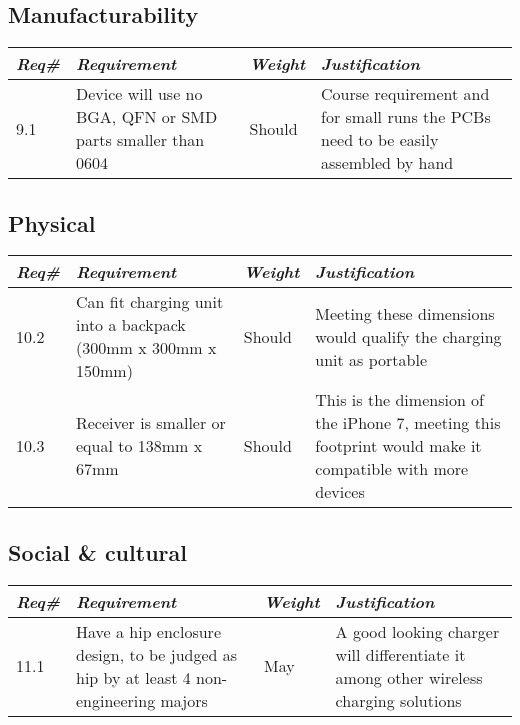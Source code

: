     \subsection{Manufacturability}
        \begin{centering}
        \begin{tabular}{|l|m{7cm}|l|m{7cm}|} \hline
        \textit{\textbf{Req\#}}	& \textit{\textbf{Requirement}} &\textit{\textbf{Weight}}&\textit{\textbf{Justification}} \\ \hline
        9.1 & Device will use no BGA, QFN or SMD parts smaller than 0604 & Should & Course requirement and for small runs the PCBs need to be easily assembled by hand \\ \hline    
        \end{tabular}
        \end{centering}

    \subsection{Physical}
        \begin{centering}
        \begin{tabular}{|l|m{7cm}|l|m{7cm}|} \hline
        \textit{\textbf{Req\#}}	& \textit{\textbf{Requirement}} &\textit{\textbf{Weight}}&\textit{\textbf{Justification}} \\ \hline
        10.2 & Can fit charging unit into a backpack (300mm x 300mm x 150mm)	& Should & Meeting these dimensions would qualify the charging unit as portable \\ \hline
        10.3 & Receiver is smaller or equal to 138mm x 67mm	& Should & This is the dimension of the iPhone 7, meeting this footprint would make it compatible with more devices \\ \hline    
        \end{tabular}
        \end{centering}
        
 
        
    \subsection{Social \& cultural}
        \begin{centering}
        \begin{tabular}{|l|m{7cm}|l|m{7cm}|} \hline
        \textit{\textbf{Req\#}}	& \textit{\textbf{Requirement}} &\textit{\textbf{Weight}}&\textit{\textbf{Justification}} \\ \hline
        11.1 & Have a hip enclosure design, to be judged as hip by at least 4 non-engineering majors & May & A good looking charger will differentiate it among other wireless charging solutions \\ \hline
        \end{tabular}
        \end{centering}
             
